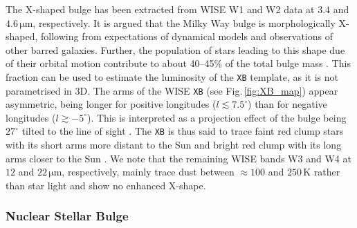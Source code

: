\documentclass[doublespace,nopageskip]{VTthesis} %
\newcommand{\mrm}[1]{\mathrm{#1}}
\begin{document}
The X-shaped bulge \citep[\texttt{XB},][]{Ness2016_Xbulge_WISE} has been extracted from WISE W1 and W2 data at $3.4$ and $4.6\,\mrm{\mu m}$, respectively.
%
It is argued that the Milky Way bulge is morphologically X-shaped, following from expectations of dynamical models and observations of other barred galaxies.
%
Further, the population of stars leading to this shape due of their orbital motion contribute to about 40--45\% of the total bulge mass \citep{Portail2015_MilkyWayorbots_Xbulge}.
%
This fraction can be used to estimate the luminosity of the \texttt{XB} template, as it is not parametrised in 3D.
%
The arms of the WISE \texttt{XB} (see Fig.\,\ref{fig:XB_map}) appear asymmetric, being longer for positive longitudes ($l \lesssim 7.5^{\circ}$) than for negative longitudes ($l \gtrsim -5^{\circ}$).
%
This is interpreted as a projection effect of the bulge being $27^{\circ}$ tilted to the line of sight \citep{Wegg2013_bulgebar}.
%
The \texttt{XB} is thus said to trace faint red clump stars with its short arms more distant to the Sun and bright red clump with its long arms closer to the Sun \cite[][cf. discussion about the `double red clump' of the Milky Way]{Lee2018_DoubleRedClump}.
%
We note that the remaining WISE bands W3 and W4 at $12$ and $22\,\mrm{\mu m}$, respectively, mainly trace dust between $\approx 100$ and $250\,\mrm{K}$ rather than star light and show no enhanced X-shape.


\subsubsection{Nuclear Stellar Bulge}
\end{document}
